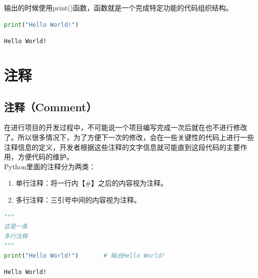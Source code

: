 输出的时候使用print()函数，函数就是一个完成特定功能的代码组织结构。\\


\begin{lstlisting}[language=Python]
print("Hello World!")
\end{lstlisting}

\begin{tcolorbox}
	\begin{verbatim}
Hello World!
	\end{verbatim}
\end{tcolorbox}

\newpage

\section{注释}

\subsection{注释（Comment）}

在进行项目的开发过程中，不可能说一个项目编写完成一次后就在也不进行修改了。所以很多情况下，为了方便下一次的修改，会在一些关键性的代码上进行一些注释信息的定义，开发者根据这些注释的文字信息就可能直到这段代码的主要作用，方便代码的维护。\\

Python里面的注释分为两类：

\begin{enumerate}
	\item 单行注释：将一行内【\#】之后的内容视为注释。
	\item 多行注释：三引号中间的内容视为注释。
\end{enumerate}

\vspace{0.5cm}


\begin{lstlisting}[language=Python]
"""
这是一条
多行注释
"""
print("Hello World!")		# 输出Hello World!
\end{lstlisting}

\begin{tcolorbox}
	\begin{verbatim}
Hello World!
	\end{verbatim}
\end{tcolorbox}

